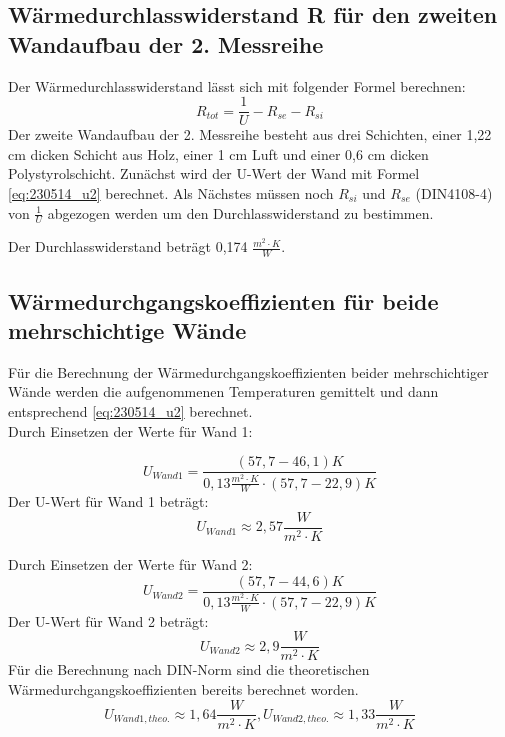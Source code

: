 \subsection{Wärmedurchlasswiderstand R für den zweiten Wandaufbau der 2. Messreihe}
Der Wärmedurchlasswiderstand lässt sich mit folgender Formel berechnen:
%
\begin{equation}
R_{tot}=\frac{1} {U} - R_{se} - R_{si}
  \label{eq:230522_Wärmewiderstand}
\end{equation}
%
Der zweite Wandaufbau der 2. Messreihe besteht aus drei Schichten, einer 1,22 cm dicken Schicht aus Holz, einer 1 cm Luft und einer 0,6 cm dicken Polystyrolschicht. 
Zunächst wird der U-Wert der Wand mit Formel \ref{eq:230514_u2}  berechnet. Als Nächstes müssen noch $R_{si}$ und $R_{se}$ (DIN4108-4) von  $\frac{1}{U}$ abgezogen werden um den Durchlasswiderstand zu bestimmen. 

Der Durchlasswiderstand beträgt 0,174 $\frac{ m^2 \cdot K }{W}$. 

\subsection{Wärmedurchgangskoeffizienten für beide mehrschichtige Wände}
Für die Berechnung der Wärmedurchgangskoeffizienten beider mehrschichtiger Wände werden die aufgenommenen Temperaturen gemittelt und dann entsprechend \autoref{eq:230514_u2} berechnet.\\
Durch Einsetzen der Werte für Wand 1:

$$U_{Wand1} = \frac{(57,7-46,1)K }{ 0,13 \frac{m^2\cdot K}{W}\cdot  (57,7 - 22,9)K}$$
Der U-Wert für Wand 1 beträgt:
\begin{equation*}
  U_{Wand 1} \approx 2,57 \frac{W}{m^2 \cdot K}
\end{equation*}

Durch Einsetzen der Werte für Wand 2:
$$U_{Wand2} = \frac{(57,7-44,6)K }{ 0,13 \frac{m^2\cdot K}{W}\cdot  (57,7 - 22,9)K}$$
Der U-Wert für Wand 2 beträgt:
\begin{equation*}
  U_{Wand 2} \approx 2,9 \frac{W}{m^2 \cdot K}
\end{equation*}
\newpage
Für die Berechnung nach DIN-Norm sind die theoretischen Wärmedurchgangskoeffizienten bereits berechnet worden.
\begin{equation*}
  U_{Wand 1,theo.}\approx 1,64 \frac{W}{m^2 \cdot K}, U_{Wand 2,theo.}\approx 1,33 \frac{W}{m^2 \cdot K}
\end{equation*}

